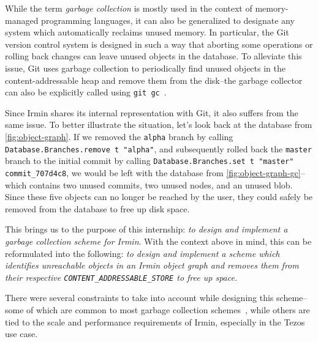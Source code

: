 While the term \emph{garbage collection} is mostly used in the context of memory-managed programming languages, it can also be generalized to designate any system which automatically reclaims unused memory. In particular, the Git version control system is designed in such a way that aborting some operations or rolling back changes can leave unused objects in the database. To alleviate this issue, Git uses garbage collection to periodically find unused objects in the content-addressable heap and remove them from the disk--the garbage collector can also be explicitly called using \texttt{git\ gc}~\cite{git-gc}.

Since Irmin shares its internal representation with Git, it also suffers from the same issue. To better illustrate the situation, let's look back at the database from \cref{fig:object-graph}. If we removed the \texttt{alpha} branch by calling \texttt{Database.Branches.remove t "alpha"}, and subsequently rolled back the \texttt{master} branch to the initial commit by calling \texttt{Database.Branches.set t "master" commit_707d4c8}, we would be left with the database from \cref{fig:object-graph-gc}--which contains two unused commits, two unused nodes, and an unused blob. Since these five objects can no longer be reached by the user, they could safely be removed from the database to free up disk space.



\bigskip
This brings us to the purpose of this internship: \emph{to design and implement a garbage collection scheme for Irmin}. With the context above in mind, this can be reformulated into the following: \emph{to design and implement a scheme which identifies unreachable objects in an Irmin object graph and removes them from their respective \texttt{CONTENT\_ADDRESSABLE\_STORE} to free up space.}

\bigskip
There were several constraints to take into account while designing this scheme--some of which are common to most garbage collection schemes~\cite{handbook}, while others are tied to the scale and performance requirements of Irmin, especially in the Tezos use case.

